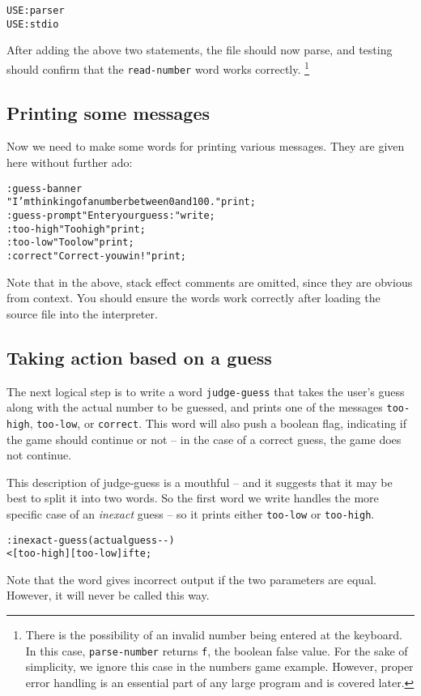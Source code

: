 \documentclass[english]{article}
\begin{document}
\begin{alltt}
USE: parser
USE: stdio
\end{alltt}
After adding the above two statements, the file should now parse,
and testing should confirm that the \texttt{read-number} word works correctly.%
\footnote{There is the possibility of an invalid number being entered at the
keyboard. In this case, \texttt{parse-number} returns \texttt{f},
the boolean false value. For the sake of simplicity, we ignore this
case in the numbers game example. However, proper error handling is
an essential part of any large program and is covered later.%
}


\subsection{Printing some messages}

Now we need to make some words for printing various messages. They
are given here without further ado:

\begin{alltt}
: guess-banner
    "I'm thinking of a number between 0 and 100." print ;
: guess-prompt "Enter your guess: " write ;
: too-high "Too high" print ;
: too-low "Too low" print ;
: correct "Correct - you win!" print ;
\end{alltt}
Note that in the above, stack effect comments are omitted, since they
are obvious from context. You should ensure the words work correctly
after loading the source file into the interpreter.


\subsection{Taking action based on a guess}

The next logical step is to write a word \texttt{judge-guess} that
takes the user's guess along with the actual number to be guessed,
and prints one of the messages \texttt{too-high}, \texttt{too-low},
or \texttt{correct}. This word will also push a boolean flag, indicating
if the game should continue or not -- in the case of a correct guess,
the game does not continue.

This description of judge-guess is a mouthful -- and it suggests that
it may be best to split it into two words. So the first word we write
handles the more specific case of an \emph{inexact} guess -- so it
prints either \texttt{too-low} or \texttt{too-high}.

\begin{alltt}
: inexact-guess ( actual guess -{}- )
     < {[} too-high {]} {[} too-low {]} ifte ;
\end{alltt}
Note that the word gives incorrect output if the two parameters are
equal. However, it will never be called this way.
\end{document}
